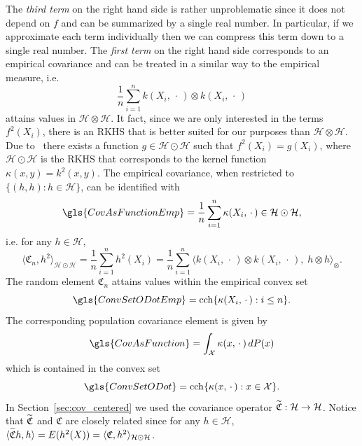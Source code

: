 \documentclass[AHL,Unicode,longabstracts,published]{cedram}
\theoremstyle{remark}
\DeclareMathOperator{\cch}{cch}
\newcommand{\X}{\mathcal{X}}
\newcommand{\cH}{\mathcal{H}}
\newcommand{\fkC}{\mathfrak{C}}
\newcommand{\Cov}{\tilde{\fkC}}
\let\oldtilde\tilde
\renewcommand*{\tilde}[1]{\mathchoice{\widetilde{#1}}{\widetilde{#1}}{\oldtilde{#1}}{\oldtilde{#1}}}
\renewcommand*{\to}{\mathchoice{\longrightarrow}{\rightarrow}{\rightarrow}{\rightarrow}}
\begin{document}
The \emph{third term} on the right hand side is rather unproblematic since it does not depend on $f$ and can be summarized by a single real number. In particular, if we approximate each term individually then we can compress this term down to a single real number. The
\emph{first term} on the right hand side corresponds to an empirical covariance and can be treated in a similar way to the empirical measure, i.e.
\[
\frac{1}{n} \sum_{i=1}^n k(X_i,\,\cdot\,) \otimes k(X_i,\,\cdot\,)
\]
attains values in $\cH \otimes \cH$. It fact, since we are only interested in the terms $f^2(X_i)$, there is an RKHS that is better suited for our purposes than $\cH \otimes \cH$. Due to~\cite[Theorem~5.16]{PAUL16} there exists a function $g\in \cH \odot \cH$ such that $f^2(X_i) = g(X_i)$, where $\cH\odot \cH$ is the RKHS that corresponds to the kernel function $\kappa(x,y) = k^2(x,y)$. The empirical covariance, when restricted to $\{ (h,h) : h \in \cH \}$, can be identified with
\[
\gls{CovAsFunctionEmp}= \frac{1}{n} \sum_{i=1}^n \kappa(X_i,\,\cdot\,) \in \cH \odot \cH,
\]
i.e. for any $h \in \cH$,
\[
\langle \fkC_n, h^2 \rangle_{\cH \odot \cH} = \frac{1}{n} \sum_{i=1}^n h^2(X_i) = \frac{1}{n} \sum_{i=1}^n \bigl\langle k(X_i,\,\cdot\,) \otimes k(X_i, \,\cdot\,),\; h\otimes h \bigr\rangle_{\otimes}.
\]
The random element $\fkC_n$ attains values within the empirical convex set
\[
\gls{ConvSetODotEmp} = \cch \{\kappa(X_i,\,\cdot\,) : i \leq n\}.
\]
The corresponding population covariance element is given by
\begin{equation}\label{eq:cov_as_mean_emb}
\gls{CovAsFunction} = \int_{\X} \kappa(x,\,\cdot\,) \, dP(x)
\end{equation}
which is contained in the convex set
\[
\gls{ConvSetODot}= \cch \{ \kappa(x,\,\cdot\,) : x\in \X \}.
\]
In Section~\ref {sec:cov_centered} we used the covariance operator $\Cov:\cH \to \cH$. Notice that $\Cov$ and $\fkC$ are closely related since for any $h\in \cH$, $\langle \Cov h,h \rangle = E(h^2(X)) = \langle \fkC, h^2 \rangle_{\cH \odot \cH}$.
\end{document}
